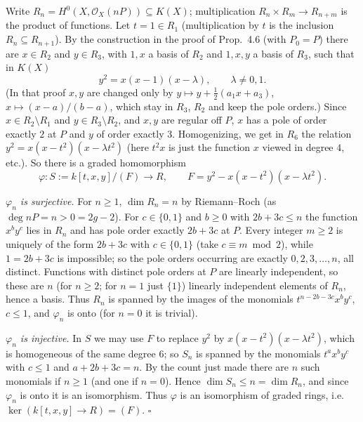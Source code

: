 \documentclass[11pt]{article}
\begin{document}
\pf
Write $R_n=H^0(X,\mathcal O_X(nP))\subseteq K(X)$; multiplication $R_n\times R_m\to R_{n+m}$ is the product of functions. Let $t=1\in R_1$ (multiplication by $t$ is the inclusion $R_n\subseteq R_{n+1}$). By the construction in the proof of Prop.~4.6 (with $P_0=P$) there are $x\in R_2$ and $y\in R_3$, with $1,x$ a basis of $R_2$ and $1,x,y$ a basis of $R_3$, such that in $K(X)$
\[ y^2=x(x-1)(x-\lambda),\qquad \lambda\ne0,1 . \]
(In that proof $x,y$ are changed only by $y\mapsto y+\tfrac12(a_1x+a_3)$, $x\mapsto (x-a)/(b-a)$, which stay in $R_3$, $R_2$ and keep the pole orders.) Since $x\in R_2\setminus R_1$ and $y\in R_3\setminus R_2$, and $x,y$ are regular off $P$, $x$ has a pole of order exactly $2$ at $P$ and $y$ of order exactly $3$. Homogenizing, we get in $R_6$ the relation $y^2=x(x-t^2)(x-\lambda t^2)$ (here $t^2x$ is just the function $x$ viewed in degree $4$, etc.). So there is a graded homomorphism
\[ \varphi: S:=k[t,x,y]/(F)\to R,\qquad F=y^2-x(x-t^2)(x-\lambda t^2). \]

\emph{$\varphi_n$ is surjective.} For $n\ge1$, $\dim R_n=n$ by Riemann--Roch (as $\deg nP=n>0=2g-2$). For $c\in\{0,1\}$ and $b\ge0$ with $2b+3c\le n$ the function $x^by^c$ lies in $R_n$ and has pole order exactly $2b+3c$ at $P$. Every integer $m\ge2$ is uniquely of the form $2b+3c$ with $c\in\{0,1\}$ (take $c\equiv m \bmod 2$), while $1=2b+3c$ is impossible; so the pole orders occurring are exactly $0,2,3,\dots,n$, all distinct. Functions with distinct pole orders at $P$ are linearly independent, so these are $n$ (for $n\ge2$; for $n=1$ just $\{1\}$) linearly independent elements of $R_n$, hence a basis. Thus $R_n$ is spanned by the images of the monomials $t^{n-2b-3c}x^by^c$, $c\le1$, and $\varphi_n$ is onto (for $n=0$ it is trivial).

\emph{$\varphi_n$ is injective.} In $S$ we may use $F$ to replace $y^2$ by $x(x-t^2)(x-\lambda t^2)$, which is homogeneous of the same degree $6$; so $S_n$ is spanned by the monomials $t^ax^by^c$ with $c\le 1$ and $a+2b+3c=n$. By the count just made there are $n$ such monomials if $n\ge1$ (and one if $n=0$). Hence $\dim S_n\le n=\dim R_n$, and since $\varphi_n$ is onto it is an isomorphism. Thus $\varphi$ is an isomorphism of graded rings, i.e.\ $\ker(k[t,x,y]\to R)=(F)$. \hfill$\square$
\end{document}
